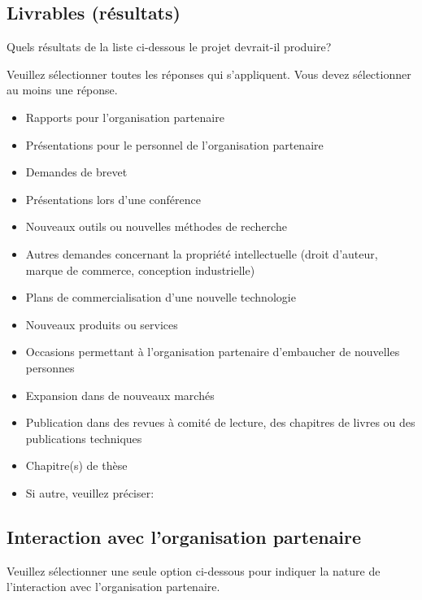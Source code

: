 \documentclass{mitacs-acceleration}
\begin{document}

\subsection{Livrables (résultats)} %

\begin{instructions}
Quels résultats de la liste ci-dessous le projet devrait-il produire?

Veuillez sélectionner toutes les réponses qui s'appliquent. Vous devez sélectionner au moins une réponse.
\end{instructions}

\begin{itemize}[label=$\boxempty$]
\item Rapports pour l'organisation partenaire
\item Présentations pour le personnel de l'organisation partenaire  
\item Demandes de brevet  
\item Présentations lors d'une conférence 
\item Nouveaux outils ou nouvelles méthodes de recherche 
\item Autres demandes concernant la propriété intellectuelle (droit d'auteur, marque de commerce, conception industrielle) 
\item Plans de commercialisation d'une nouvelle technologie     
\item Nouveaux produits ou services   
\item Occasions permettant à l'organisation partenaire d'embaucher de nouvelles personnes  
\item Expansion dans de nouveaux marchés 
\item Publication dans des revues à comité de lecture, des chapitres de livres ou des publications techniques  
\item Chapitre(s) de thèse 
\item Si autre, veuillez préciser:
\end{itemize}


\subsection{Interaction avec l'organisation partenaire} %

\begin{instructions}
Veuillez sélectionner une seule option ci-dessous pour indiquer la nature de l'interaction avec l'organisation partenaire.
\end{instructions}
\end{document}
